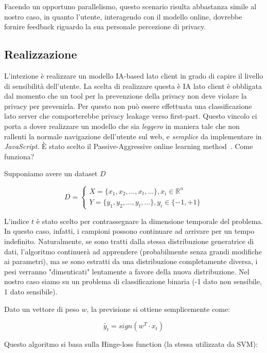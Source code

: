 Facendo un opportuno parallelismo, questo scenario risulta abbastanza simile al nostro caso, in quanto l'utente, interagendo con il modello online, dovrebbe fornire feedback riguardo la sua personale percezione di privacy.

\subsection{Realizzazione}
L'intezione è realizzare un modello IA-based lato client in grado di capire il livello di sensibilità dell'utente. La scelta di realizzare questa è IA lato client è obbligata dal momento che un tool per la prevenzione della privacy non deve violare la privacy per prevenirla. Per questo non può essere effettuata una classificazione lato server che comporterebbe privacy leakage verso first-part. Questo vincolo ci porta a dover realizzare un modello che sia \textit{leggero} in maniera tale che non rallenti la normale navigazione dell'utente sul web, e \textit{semplice} da implementare in \textit{JavaScript}. È stato scelto il Passive-Aggressive online learning method~\cite{PAalgo}. Come funziona?

Supponiamo avere un dataset $D$

$$D=\left\{
                \begin{array}{ll}
                  X=\{x_1,x_2,\dots ,x_t,\dots \}, x_i \in \mathbb{R}^n \\
                  Y=\{y_1,y_2,\dots ,y_t,\dots\}, y_i \in \{-1,+1\}
                \end{array}
              \right.$$

L'indice $t$ è stato scelto per contrassegnare la dimensione temporale del problema. In questo caso, infatti, i campioni possono continuare ad arrivare per un tempo indefinito. Naturalmente, se sono tratti dalla stessa distribuzione generatrice di dati, l'algoritmo continuerà ad apprendere (probabilmente senza grandi modifiche ai parametri), ma se sono estratti da una distribuzione completamente diversa, i pesi verranno "dimenticati" lentamente a favore della nuova distribuzione. Nel nostro caso siamo su un problema di classificazione binaria (-1 dato non sensibile, 1 dato sensibile).

Dato un vettore di peso $w$, la previsione si ottiene semplicemente come:

$$\tilde{y_t}=sign(w^T\cdot x_t)$$

Questo algoritmo si basa sulla Hinge-loss function (la stessa utilizzata da SVM):

